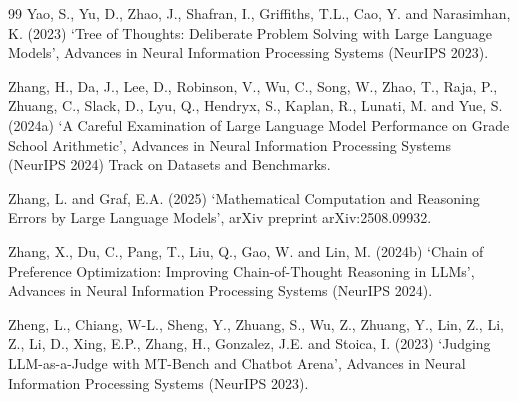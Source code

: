 \documentclass[a4paper,11pt,twoside]{report}
\begin{document}
\begin{thebibliography}{99}
Yao, S., Yu, D., Zhao, J., Shafran, I., Griffiths, T.L., Cao, Y. and
Narasimhan, K. (2023) `Tree of Thoughts: Deliberate Problem Solving with
Large Language Models', Advances in Neural Information Processing
Systems (NeurIPS 2023).

Zhang, H., Da, J., Lee, D., Robinson, V., Wu, C., Song, W., Zhao, T.,
Raja, P., Zhuang, C., Slack, D., Lyu, Q., Hendryx, S., Kaplan, R.,
Lunati, M. and Yue, S. (2024a) `A Careful Examination of Large Language
Model Performance on Grade School Arithmetic', Advances in Neural
Information Processing Systems (NeurIPS 2024) Track on Datasets and
Benchmarks.

Zhang, L. and Graf, E.A. (2025) `Mathematical Computation and Reasoning
Errors by Large Language Models', arXiv preprint arXiv:2508.09932.

Zhang, X., Du, C., Pang, T., Liu, Q., Gao, W. and Lin, M. (2024b) `Chain
of Preference Optimization: Improving Chain-of-Thought Reasoning in
LLMs', Advances in Neural Information Processing Systems (NeurIPS 2024).

Zheng, L., Chiang, W-L., Sheng, Y., Zhuang, S., Wu, Z., Zhuang, Y., Lin,
Z., Li, Z., Li, D., Xing, E.P., Zhang, H., Gonzalez, J.E. and Stoica, I.
(2023) `Judging LLM-as-a-Judge with MT-Bench and Chatbot Arena',
Advances in Neural Information Processing Systems (NeurIPS 2023).

\end{thebibliography}
\end{document}
